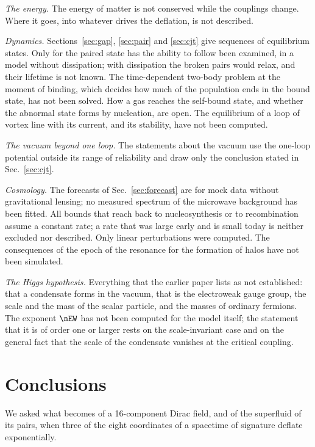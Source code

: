 \emph{The energy.} The energy of matter is not conserved while the couplings change. Where it goes,
into whatever drives the deflation, is not described.

\emph{Dynamics.} Sections~\ref{sec:gap}, \ref{sec:pair} and \ref{sec:cjt} give sequences of
equilibrium states. Only for the paired state has the ability to follow been examined, in a model
without dissipation; with dissipation the broken pairs would relax, and their lifetime is not known.
The time-dependent two-body problem at the moment of binding, which decides how much of the
population ends in the bound state, has not been solved. How a gas reaches the self-bound state, and
whether the abnormal state forms by nucleation, are open. The equilibrium of a loop of vortex line
with its current, and its stability, have not been computed.

\emph{The vacuum beyond one loop.} The statements about the vacuum use the one-loop potential
outside its range of reliability and draw only the conclusion stated in Sec.~\ref{sec:cjt}.

\emph{Cosmology.} The forecasts of Sec.~\ref{sec:forecast} are for mock data without gravitational
lensing; no measured spectrum of the microwave background has been fitted. All bounds that reach
back to nucleosynthesis or to recombination assume a constant rate; a rate that was large early and
is small today is neither excluded nor described. Only linear perturbations were computed. The
consequences of the epoch of the resonance for the formation of halos have not been simulated.

\emph{The Higgs hypothesis.} Everything that the earlier paper lists as not established: that a
condensate forms in the vacuum, that  is the electroweak gauge group, the scale and the mass of the scalar particle, and the
masses of ordinary fermions. The exponent $\nEW$ has not been computed for the model itself; the
statement that it is of order one or larger rests on the scale-invariant case and on the general
fact that the scale of the condensate vanishes at the critical coupling.

\section{Conclusions}
\label{sec:concl}

We asked what becomes of a 16-component Dirac field, and of the superfluid of its pairs, when three
of the eight coordinates of a spacetime of signature  deflate exponentially.

